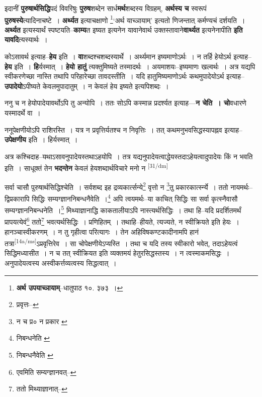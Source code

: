 \documentclass[article,12pt,a4paper]{memoir}
\begin{document}
	  \pstart इदानीं \textbf{पुरुषार्थसिद्धि}पदं विवरिषुः \textbf{पुरुष}शब्देन सार्ध\textbf{मर्थ}शब्दस्य विग्रहम्, \textbf{अर्थस्य च} स्वरूपं \textbf{पुरुषस्ये}त्यादिनाचष्टे । \textbf{अर्थ्यत} इत्याचक्षाणो \footnote{\textbf{अर्थ उपयाच्ञायाम्}--धातुपाठ १०. ३७३ ।}‘अर्थ याच्ञायाम्’ इत्यतो णिजन्तात् कर्मण्यचं दर्शयति । \textbf{अर्थ्यत} इत्यस्यार्थं स्पष्टयति--\textbf{काम्य}त इष्यत इत्यनेन यावानेवार्थ उक्तस्तावाने\textbf{वार्थ्यत} इत्यनेनापीति \textbf{इति यावदि}त्यस्यार्थः ।
	\pend
      

	  \pstart कोऽसावर्थ इत्याह--\textbf{हेय} इति । \textbf{वा}शब्दश्चशब्दस्यार्थे । अर्थ्यमान इष्यमाणोऽर्थः । न तर्हि हेयोऽर्थ इत्याह--\textbf{हेय} इति । \textbf{हि}र्यस्मात् । \textbf{हेयो हातुं} त्यक्तुमिष्यते तस्मादर्थः । अयमाशयः--इष्यमाणः खल्वर्थः । अत्र यद्यपि स्वीकरणेच्छा नास्ति तथापि परिहारेच्छा तावदस्तीति । यदि हातुमिष्यमाणोऽर्थः कथमुपादेयोऽर्थ इत्याह--\textbf{उपादेयो}ऽपीष्यते केवलमुपादातुम् । न केवलं हेय इष्यते इत्यपिशब्दः ।
	\pend
      

	  \pstart ननु च न हेयोपादेयावर्थोऽपि तु अन्योपि । ततः सोऽपि कस्मान्न प्रदर्श्यत इत्याह—\textbf{न चेति । चो}वधारणे यस्मादर्थे वा ।
	\pend
      

	  \pstart ननूपेक्षणीयोऽपि राशिरस्ति । यत्र न प्रवृत्तिर्यतश्च न निवृत्तिः । तत् कथमनुभवसिद्धस्यापह्नव इत्याह--\textbf{उपेक्षणीय} इति । हिर्यस्मात् ।
	\pend
      

	  \pstart अत्र कश्चिदाह--यथाऽसावनुपादेयस्तथाऽहयोपि । तत्र यद्यनुपादेयत्वाद्धेयस्तदाऽहेयत्वादुपादेयः किं न भवति इति । साधूक्तं तेन \textbf{भदन्तेन} केवलं हेयशब्दार्थविचारे मनो न  \leavevmode\textsuperscript{\rmlatinfont\tiny [31/dm]} 
	  
	सर्वा चासौ पुरुषार्थसिद्धिश्चेति । सर्वशब्द इह द्रव्यकार्त्सन्ये\footnote{प्रवृत्तः--\cite{dp-msD}} वृत्तो न \footnote{न च प्र० \cite{dp-msB} \cite{dp-edH} न प्रकार \cite{dp-msC} \cite{dp-edP} \cite{dp-edE}}तु प्रकारकार्त्स्न्ये । ततो नायमर्थः--द्विप्रकारापि सिद्धिः सम्यग्ज्ञाननिबन्धनैवेति ।\footnote{निबन्धनेति \cite{dp-msA} \cite{dp-msB} \cite{dp-msD} \cite{dp-edP} \cite{dp-edH} \cite{dp-edE}} अपि त्वयमर्थः--या काचित् सिद्धिः सा सर्वा कृत्स्नैवासौ सम्यग्ज्ञाननिबन्धनेति ।\footnote{निबन्धनैवेति \cite{dp-msA} \cite{dp-edP} \cite{dp-edH} \cite{dp-edE}} मिथ्याज्ञानाद्धि काकतालीयाऽपि नास्त्यर्थसिद्धिः । तथा हि--यदि प्रदर्शितमर्थं प्रापयत्येवं\footnote{एवमिति सम्यग्ज्ञानवत्--\cite{dp-msD-n}} ततो\footnote{ततो मिथ्याज्ञानात्--\cite{dp-msD-n}} भवत्यर्थसिद्धिः । प्रणिहितम् । तथाहि--हीयते, त्यज्यते, न स्वीक्रियते इति हेयः । हानञ्चास्वीकरणम् । न तु गृहीत्वा परित्यागः । तेन अहिविषकण्टकादीनामपि हानं तत्रा\leavevmode\textsuperscript{\rmlatinfont\tiny [14a/ms]}ऽप्रवृत्तिरेव । सा चोपेक्षणीयेऽप्यस्ति । तथा च यदि तस्य स्वीकारो भवेत्, तदाऽहेयत्वं सिद्धिमध्यासीत । न च तत् स्वीक्रियत इति व्यक्तमयं हेतुरसिद्धस्तस्य । न त्वस्माकमसिद्धः । अनुपादेयत्वस्य अस्वीकर्त्तव्यत्वस्य सिद्धत्वात् ।
	\pend
      
\end{document}
